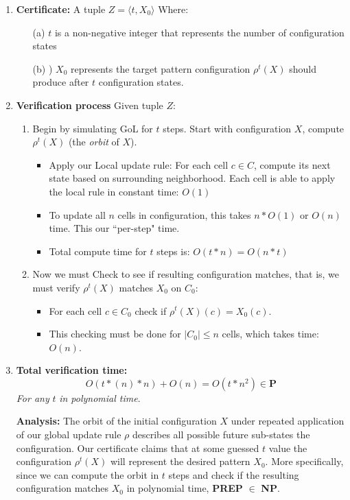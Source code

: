 \documentclass{article}
\theoremstyle{definition}
\theoremstyle{plain}
\theoremstyle{plain}
\begin{document}
\begin{enumerate}
    \item \textbf{Certificate:} A tuple $Z = \langle t, X_0 \rangle$
      Where: 
      \begin{enumerate}
          \item[(a)] $t$ is a non-negative integer that represents the number of configuration states 
          \item[(b)]) $X_0$ represents the target pattern configuration $\rho^t(X)$ should produce after $t$ configuration states.
      \end{enumerate}
    \item \textbf{Verification process} Given tuple $Z$:
    \begin{enumerate}
        \item Begin by simulating GoL for $t$ steps. Start with configuration $X$, compute $\rho^t(X)$ (the \textit{orbit} of $X$).
        \begin{itemize}
            \item Apply our Local update rule: For each cell $c \in C$, compute its next state based on surrounding neighborhood. Each cell is able to apply the local rule in constant time: $O(1)$
            \item To update all $n$ cells in configuration, this takes $n*O(1)$ or $O(n)$ time. This our ``per-step" time.
            \item Total compute time for $t$ steps is: $O(t * n) = O(n * t)$
        \end{itemize}
        \item Now we must Check to see if resulting configuration matches, that is, we must verify $\rho^t(X)$  matches $X_0$ on $C_0$:
        \begin{itemize}
            \item For each cell $c \in C_0$ check if $\rho^t(X)(c) = X_0(c)$.
            \item This checking must be done for $ |C_0| \leq n $ cells, which takes time: $ O(n) $.
        \end{itemize}
    \end{enumerate}

    \item \textbf{Total verification time: }
      \begin{equation}
        O(t*(n)*n)+O(n)= O(t *n^2) \in \textbf{P} 
    \end{equation}
    \textit{For any} $t$ \textit{in polynomial time}.
  \item[]\textbf{Analysis:}
    The orbit of the initial configuration $X$ under repeated application of our global update rule $\rho$ describes all possible future sub-states the configuration. Our certificate claims that at some guessed $t$ value the configuration $\rho^t(X)$ will represent the desired pattern $X_0$. More specifically, since we can compute the orbit in $t$ steps and check if the resulting configuration matches $X_0$ in polynomial time, \textbf{PREP} $\in$ \textbf{NP}.
\end{enumerate}
\end{document}
